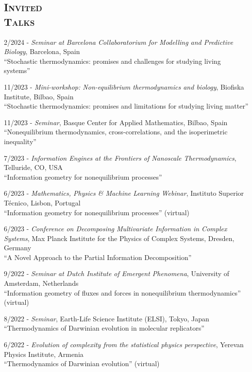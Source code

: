\documentclass[margin,line,centered]{res}
\begin{document}
\begin{resume}
\section{\textsc{Invited\\Talks}}

2/2024 - \emph{Seminar at Barcelona Collaboratorium for Modelling and Predictive Biology}, Barcelona, Spain\\
``Stochastic thermodynamics: promises and challenges for studying living systems''

11/2023 - \emph{Mini-workshop: Non-equilibrium thermodynamics and biology}, Biofiska Institute, Bilbao, Spain\\
``Stochastic thermodynamics: promises and limitations for studying living matter''

11/2023 - \emph{Seminar}, Basque Center for Applied Mathematics, Bilbao, Spain\\
``Nonequilibrium thermodynamics, cross-correlations, and the isoperimetric inequality''

7/2023 - \emph{Information Engines at the Frontiers of Nanoscale Thermodynamics}, Telluride, CO, USA\\
``Information geometry for nonequilibrium processes''

6/2023 - \emph{Mathematics, Physics \& Machine Learning Webinar}, Instituto Superior Técnico, Lisbon, Portugal\\
``Information geometry for nonequilibrium processes'' (virtual)

6/2023 - \emph{Conference on Decomposing Multivariate Information in Complex Systems}, Max Planck Institute for the Physics of Complex Systems, Dresden, Germany\\
``A Novel Approach to the Partial Information Decomposition''

9/2022 - \emph{Seminar at Dutch Institute of Emergent Phenomena}, University of Amsterdam, Netherlands\\
``Information geometry of fluxes and forces in nonequilibrium thermodynamics'' (virtual)

8/2022 - \emph{Seminar}, Earth-Life Science Institute (ELSI), Tokyo, Japan\\
``Thermodynamics of Darwinian evolution in molecular replicators''

6/2022 - \emph{Evolution of complexity from the statistical physics perspective}, Yerevan Physics Institute, Armenia\\
``Thermodynamics of Darwinian evolution'' (virtual)


\end{resume}
\end{document}
